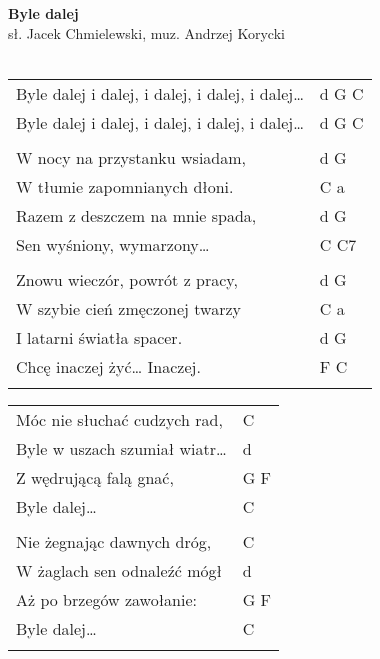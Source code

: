 \documentclass[a5paper]{article}
\begin{document}


\noindent
\fontsize{12pt}{15pt}\selectfont
\textbf{Byle dalej} \\
\fontsize{8pt}{10pt}\selectfont
sł. Jacek Chmielewski, muz. Andrzej Korycki \\ \\
\fontsize{10pt}{12pt}\selectfont
{}
\begin{tabular}{@{}p{8.5cm}p{3cm}@{}}
\noindent
Byle dalej i dalej, i dalej, i dalej, i dalej…  &d G C \\
Byle dalej i dalej, i dalej, i dalej, i dalej…  &d G C \\ \\

W nocy na przystanku wsiadam, & d G \\
W tłumie zapomnianych dłoni. & C a \\
Razem z deszczem na mnie spada, & d G \\
Sen wyśniony, wymarzony… & C C7 \\ \\

Znowu wieczór, powrót z pracy, & d G \\
W szybie cień zmęczonej twarzy & C a \\
I latarni światła spacer. & d G \\
Chcę inaczej żyć… Inaczej. & F C \\\\
\end{tabular}

\noindent
\begin{tabular}{@{}p{7.5cm}p{3cm}@{}}
Móc nie słuchać cudzych rad, & C \\
Byle w uszach szumiał wiatr… & d \\
Z wędrującą falą gnać, & G F \\
Byle dalej… & C \\\\

Nie żegnając dawnych dróg, & C \\
W żaglach sen odnaleźć mógł & d \\
Aż po brzegów zawołanie: & G F \\
Byle dalej… & C \\\\
\end{tabular}
\end{document}
